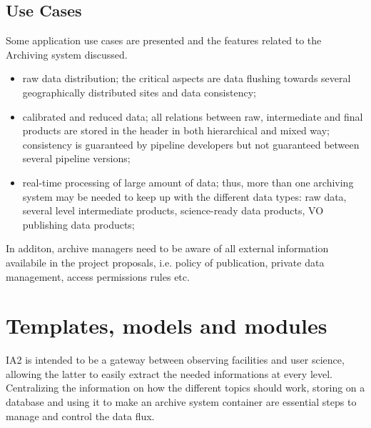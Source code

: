 \subsection{Use Cases}
Some application use cases are presented and the features related to the
Archiving system discussed.
\begin{itemize}
  \item raw data distribution; the critical aspects are data flushing towards
  several geographically distributed sites and data consistency;  
  \item calibrated and reduced data; all relations between raw, intermediate
  and final products are stored in the header in both hierarchical and mixed way;
  consistency is guaranteed by pipeline developers but not guaranteed between
  several pipeline versions; 
  \item real-time processing of large amount of data; thus, more than one archiving
  system may be needed to keep up with the different data types: raw data,
  several level intermediate products, science-ready data products, VO publishing
  data products;
\end{itemize}
In additon, archive managers need to be aware of all external information
availabile in the project proposals, i.e. policy of publication, private
data management, access permissions rules etc. 

\section{Templates, models and modules}
IA2 is intended to be a gateway between observing facilities and user science,
allowing the latter to easily extract the needed informations at every level.
Centralizing the information on how the different topics should work, storing
on a database and using it to make an archive system container are essential
steps to manage and control the data flux.

